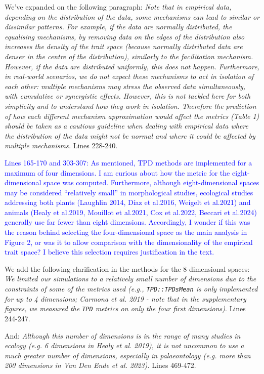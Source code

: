 \documentclass[
]{article}
\begin{document}
We've expanded on the following paragraph:
\textit{Note that in empirical data, depending on the distribution of the data, some mechanisms can lead to similar or dissimilar patterns.
For example, if the data are normally distributed, the equalising mechanisms, by removing data on the edges of the distribution also increases the density of the trait space (because normally distributed data are denser in the centre of the distribution), similarly to the facilitation mechanism.
However, if the data are distributed uniformly, this does not happen.
Furthermore, in real-world scenarios, we do not expect these mechanisms to act in isolation of each other: multiple mechanisms may stress the observed data simultaneously, with cumulative or synergistic effects.
However, this is not tackled here for both simplicity and to understand how they work in isolation. 
Therefore the prediction of how each different mechanism approximation would affect the metrics (Table 1) should be taken as a cautious guideline when dealing with empirical data where the distribution of the data might not be normal and where it could be affected by multiple mechanisms.}
Lines 228-240.

\textcolor{blue}{Lines 165-170 and 303-307: As mentioned, TPD methods are implemented for a maximum of four dimensions.
I am curious about how the metric for the eight-dimensional space was computed.
Furthermore, although eight-dimensional spaces may be considered ``relatively small'' in morphological studies, ecological studies addressing both plants (Laughlin 2014, Díaz et al.2016, Weigelt et al.2021) and animals (Healy et al.2019, Mouillot et al.2021, Cox et al.2022, Beccari et al.2024) generally use far fewer than eight dimensions.
Accordingly, I wonder if this was the reason behind selecting the four-dimensional space as the main analysis in Figure 2, or was it to allow comparison with the dimensionality of the empirical trait space? I believe this selection requires justification in the text.}

We add the following clarification in the methods for the 8 dimensional spaces:
\textit{We limited our simulations to a relatively small number of dimensions due to the constraints of some of the metrics used (e.g., \texttt{TPD::TPDsMean} is only implemented for up to 4 dimensions; Carmona et al. 2019 - note that in the supplementary figures, we measured the \texttt{TPD} metrics on only the four first dimensions)}.
Lines 244-247.

And:
\textit{Although this number of dimensions is in the range of many studies in ecology (e.g. 6 dimensions in Healy et al. 2019), it is not uncommon to use a much greater number of dimensions, especially in palaeontology (e.g. more than 200 dimensions in Van Den Ende et al. 2023).}
Lines 469-472.
\end{document}
